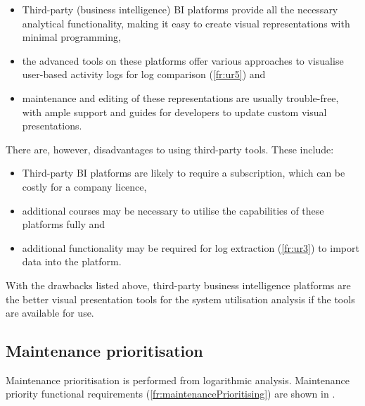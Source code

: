 \begin{itemize}
	\item \RaggedRight Third-party (business intelligence) BI platforms provide all the necessary analytical functionality, making it easy to create visual representations with minimal programming,
	\item \RaggedRight the advanced tools on these platforms offer various approaches to visualise user-based activity logs for log comparison (\ref{fr:ur5}) and
	\item \RaggedRight maintenance and editing of these representations are usually trouble-free, with ample support and guides for developers to update custom visual presentations.
\end{itemize}

\clearpage

There are, however, disadvantages to using third-party tools. These include:

\begin{itemize}
	\item \RaggedRight Third-party BI platforms are likely to require a subscription, which can be costly for a company licence,
	\item \RaggedRight additional courses may be necessary to utilise the capabilities of these platforms fully and
	\item \RaggedRight additional functionality may be required for log extraction (\ref{fr:ur3}) to import data into the platform.
	\end{itemize}

With the drawbacks listed above, third-party business intelligence platforms are the better visual presentation tools for the system utilisation analysis if the tools are available for use.

\subsection{Maintenance prioritisation}\label{sec:ch2_utilisationImprovements}
Maintenance prioritisation is performed from logarithmic analysis. Maintenance priority functional requirements (\ref{fr:maintenancePrioritising}) are shown in .

